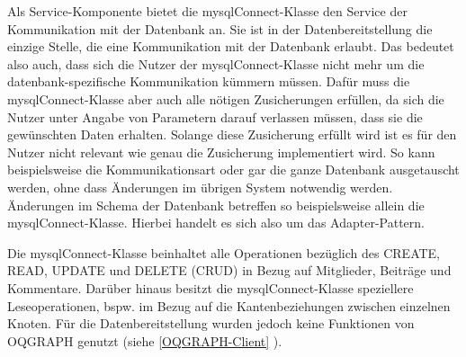 Als Service-Komponente bietet die mysqlConnect-Klasse den Service der Kommunikation mit der Datenbank an. Sie ist in der Datenbereitstellung die einzige Stelle, die eine Kommunikation mit der Datenbank erlaubt. Das bedeutet also auch, dass sich die Nutzer der mysqlConnect-Klasse nicht mehr um die datenbank-spezifische Kommunikation kümmern müssen. Dafür muss die mysqlConnect-Klasse aber auch alle nötigen Zusicherungen erfüllen, da sich die Nutzer unter Angabe von Parametern darauf verlassen müssen, dass sie die gewünschten Daten erhalten. Solange diese Zusicherung erfüllt wird ist es für den Nutzer nicht relevant wie genau die Zusicherung implementiert wird. So kann beispielsweise die Kommunikationsart oder gar die ganze Datenbank ausgetauscht werden, ohne dass Änderungen im übrigen System notwendig werden. Änderungen im Schema der Datenbank betreffen so beispielsweise allein die mysqlConnect-Klasse. Hierbei handelt es sich also um das Adapter-Pattern.

Die mysqlConnect-Klasse beinhaltet alle Operationen bezüglich des CREATE, READ, UPDATE und DELETE (CRUD) in Bezug auf Mitglieder, Beiträge und Kommentare. Darüber hinaus besitzt die mysqlConnect-Klasse speziellere Leseoperationen, bspw. im Bezug auf die Kantenbeziehungen zwischen einzelnen Knoten. Für die Datenbereitstellung wurden jedoch keine Funktionen von OQGRAPH genutzt (siehe \ref{OQGRAPH-Client} ).

